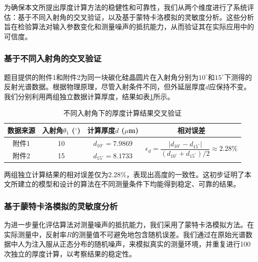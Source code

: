 \documentclass[withoutpreface,bwprint]{cumcmthesis} %
\begin{document}
为确保本文所提出厚度计算方法的稳健性和可靠性，我们从两个维度进行了系统评估：基于不同入射角的交叉验证，以及基于蒙特卡洛模拟的灵敏度分析。这些分析旨在检验算法对输入参数变化和测量噪声的抵抗能力，从而验证其在实际应用中的可信度。

\subsubsection{基于不同入射角的交叉验证}

题目提供的附件1和附件2为同一块碳化硅晶圆片在入射角分别为$10^\circ$和$15^\circ$下测得的反射光谱数据。根据物理原理，尽管入射条件不同，但外延层厚度$d$应保持不变。我们分别利用两组独立数据计算厚度，结果如表\ref{tab:cross-validation}所示。

\begin{table}[htbp]
    \centering
    \caption{不同入射角下的厚度计算结果交叉验证}
    \label{tab:cross-validation}
    \begin{tabular}{cccc}
        \toprule
        数据来源 & 入射角$\theta_1$ ($^\circ$) & 计算厚度$d$ ($\mu$m)        & 相对误差                                                                                                                  \\
        \midrule
        附件1  & 10                       & $d_{10^\circ} = 7.9869$ & \multirow{2}{*}{$\epsilon_d = \dfrac{|d_{10^\circ} - d_{15^\circ}|}{(d_{10^\circ} + d_{15^\circ})/2} \approx 2.28\%$} \\
        附件2  & 15                       & $d_{15^\circ} = 8.1733$ &                                                                                                                       \\
        \bottomrule
    \end{tabular}
\end{table}

两组独立计算结果的相对误差仅为$2.28\%$，表现出高度的一致性。这初步证明了本文所建立的模型和设计的算法在不同测量条件下均能得到稳定、可靠的结果。

\subsubsection{基于蒙特卡洛模拟的灵敏度分析}

为进一步量化评估算法对测量噪声的抵抗能力，我们采用了蒙特卡洛模拟方法。在实际测量中，反射率$R$的测量值不可避免地包含随机误差。我们通过在原始光谱数据中人为注入服从正态分布的随机噪声，来模拟真实的测量环境，并重复进行100次独立的厚度计算，以考察结果的稳定性。
\end{document}
